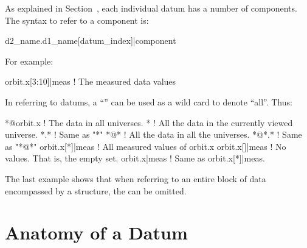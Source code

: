 As explained in Section~, each individual datum
has a number of components. The syntax to refer to a component is:
\begin{example}
  d2_name.d1_name[datum_index]|component
\end{example}
For example:
\begin{example}
  orbit.x[3:10]|meas     ! The measured data values
\end{example}

In referring to datums, a ``\vn{*}'' can be used as a wild card to 
denote ``all''. Thus:
\begin{example}
  *@orbit.x       ! The  data in all universes.
  *               ! All the data in the currently viewed universe.
  *.*             ! Same as "*"
  *@*             ! All the data in all the universes. 
  *@*.*           ! Same as "*@*"
  orbit.x[*]|meas ! All measured values of orbit.x
  orbit.x[]|meas  ! No values. That is, the empty set.
  orbit.x|meas    ! Same as orbit.x[*]|meas.
\end{example}
The last example shows that when referring to an entire block of data
encompassed by a  structure, the \vn{[*]} can be omitted.

\section{Anatomy of a Datum}
\label{s:data.anatomy}

